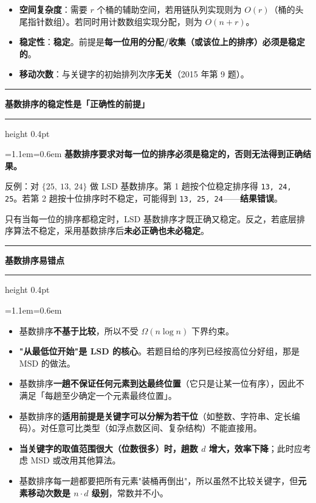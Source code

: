 \documentclass[11pt,openany,UTF8]{ctexbook}
\newcommand{\callouthead}[2]{%
  \par\addvspace{7pt}\noindent
  {\color{#1}\rule[-0.15em]{3pt}{1.05em}}\hspace{0.5em}%
  {\bfseries\color{#1}#2}\par\nobreak\vspace{-0.35em}%
  {\color{rulesep}\hrule height 0.4pt}\nobreak\vspace{0.45em}%
  \begingroup\small\setlength{\parindent}{0pt}%
  \leftskip=1.1em\rightskip=0.6em\noindent\ignorespaces}
\newcommand{\calloutend}{\par\endgroup\addvspace{7pt}}
\newenvironment{callkey}[1]{\callouthead{keybar}{#1}}{\calloutend}
\newenvironment{callwarn}[1]{\callouthead{warnbar}{#1}}{\calloutend}
\begin{document}
\begin{itemize}
\item \textbf{空间复杂度}：需要 $r$ 个桶的辅助空间，若用链队列实现则为 $O(r)$（桶的头尾指针数组）。若同时用计数数组实现分配，则为 $O(n+r)$。
\item \textbf{稳定性}：\textbf{稳定}。前提是\textbf{每一位用的分配/收集（或该位上的排序）必须是稳定的}。
\item \textbf{移动次数}：与关键字的初始排列次序\textbf{无关}（2015 年第 9 题）。
\end{itemize}
\begin{callkey}{基数排序的稳定性是「正确性的前提」}
\textbf{基数排序要求对每一位的排序必须是稳定的，否则无法得到正确结果。}

反例：对 $\{25,\ 13,\ 24\}$ 做 LSD 基数排序。第 1 趟按个位稳定排序得 \texttt{13,\allowbreak{} 24,\allowbreak{} 25}。若第 2 趟按十位排序时不稳定，可能得到 \texttt{13,\allowbreak{} 25,\allowbreak{} 24}——\textbf{结果错误}。

只有当每一位的排序都稳定时，LSD 基数排序才既正确又稳定。反之，若底层排序算法不稳定，采用基数排序后\textbf{未必正确也未必稳定}。

\end{callkey}

\begin{callwarn}{基数排序易错点}
\begin{itemize}
\item 基数排序\textbf{不基于比较}，所以不受 $\Omega(n\log n)$ 下界约束。
\item \textbf{"从最低位开始"是 LSD 的核心}。若题目给的序列已经按高位分好组，那是 MSD 的做法。
\item 基数排序\textbf{一趟不保证任何元素到达最终位置}（它只是让某一位有序），因此不满足「每趟至少确定一个元素最终位置」。
\item 基数排序的\textbf{适用前提是关键字可以分解为若干位}（如整数、字符串、定长编码）。对任意可比类型（如浮点数区间、复杂结构）不能直接用。
\item \textbf{当关键字的取值范围很大（位数很多）时，趟数 $d$ 增大，效率下降}；此时应考虑 MSD 或改用其他算法。
\item 基数排序每一趟都要把所有元素"装桶再倒出"，所以虽然不比较关键字，但\textbf{元素移动次数是 $n\cdot d$ 级别}，常数并不小。
\end{itemize}
\end{callwarn}
\end{document}
